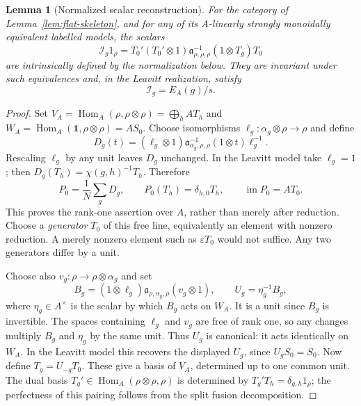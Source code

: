 \documentclass[11pt]{article}
\newtheorem{lemma}[theorem]{Lemma}
\theoremstyle{remark}
\newcommand{\Hom}{\operatorname{Hom}}
\newcommand{\im}{\operatorname{im}}
\newcommand{\eps}{\varepsilon}
\begin{document}
\begin{lemma}[Normalized scalar reconstruction]\label{lem:intrinsic-reconstruction}
For the category of Lemma~\ref{lem:flat-skeleton}, and for any of its
$A$-linearly strongly monoidally equivalent labelled models, the scalars
\begin{equation}\label{eq:intrinsic-coordinate}
 \mathcal I_g1_\rho=
 T_0'(T_0'\otimes1)\mathfrak a_{\rho,\rho,\rho}^{-1}
                  (1\otimes T_g)T_0
\end{equation}
are intrinsically defined by the normalization below. They are invariant
under such equivalences and, in the Leavitt realization, satisfy
\begin{equation}\label{eq:recon}
 \mathcal I_g=E_A(g)/s.
\end{equation}
\end{lemma}
\begin{proof}
Set $V_A=\Hom_A(\rho,\rho\otimes\rho)=\bigoplus_hAT_h$ and
$W_A=\Hom_A(\mathbf1,\rho\otimes\rho)=AS_0$.
Choose isomorphisms $\ell_g:\alpha_g\otimes\rho\to\rho$ and define
\begin{equation}\label{eq:distinguished-action}
 D_g(t)=(\ell_g\otimes1)\mathfrak a_{\alpha_g,\rho,\rho}^{-1}
                  (1\otimes t)\ell_g^{-1}.
\end{equation}
Rescaling $\ell_g$ by any unit leaves $D_g$ unchanged. In the Leavitt
model take $\ell_g=1$; then $D_g(T_h)=\chi(g,h)^{-1}T_h$. Therefore
\[
 P_0=\frac1N\sum_gD_g,\qquad P_0(T_h)=\delta_{h,0}T_h,
 \qquad\im P_0=AT_0.
\]
This proves the rank-one assertion over $A$, rather than merely after
reduction. Choose a \emph{generator} $T_0$ of this free line, equivalently
an element with nonzero reduction. A merely nonzero element such as
$\eps T_0$ would not suffice. Any two generators differ by a unit.

Choose also $v_g:\rho\to\rho\otimes\alpha_g$ and set
\begin{equation}\label{eq:normalized-U}
 B_g=(1\otimes\ell_g)\mathfrak a_{\rho,\alpha_g,\rho}(v_g\otimes1),
 \qquad U_g=\eta_g^{-1}B_g,
\end{equation}
where $\eta_g\in A^\times$ is the scalar by which $B_g$ acts on $W_A$.
It is a unit since $B_g$ is invertible. The spaces containing $\ell_g$
and $v_g$ are free of rank one, so any changes multiply $B_g$ and $\eta_g$
by the same unit. Thus $U_g$ is canonical: it acts identically on $W_A$.
In the Leavitt model this recovers the displayed $U_g$, since $U_gS_0=S_0$.
Now define $T_g=U_{-g}T_0$. These give a basis of $V_A$, determined up to
one common unit. The dual basis $T_g'\in\Hom_A(\rho\otimes\rho,\rho)$
is determined by $T_g'T_h=\delta_{g,h}1_\rho$; the perfectness of this
pairing follows from the split fusion decomposition.


\end{proof}
\end{document}
